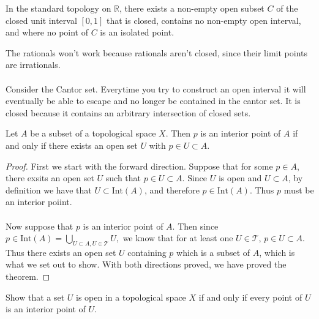 \documentclass[letterpaper,12pt,twoside]{maths}
\begin{document}
\begin{exercise}[Exercise 3.25]
    In the standard topology on $\mathbb{R}$, there
    exists a non-empty open subset $C$ of the closed unit interval $[0,
    1]$ that is closed, contains no non-empty open interval, and where no
    point of $C$ is an isolated point.
\end{exercise} 

\begin{solution}
    The rationals won't work because rationals aren't closed, since their
    limit points are irrationals. \\
    \\
    Consider the Cantor set. Everytime you try to construct an open
    interval it will eventually be able to escape and no longer be
    contained in the cantor set. It is closed because it contains an
    arbitrary intersection of closed sets.       
\end{solution}

\begin{problem}[Theorem 3.26] Let $A$ be a subset of a topological
    space $X$. Then $p$ is an interior point of $A$ if and only if
    there exists an open set $U$ with $p \in U \subset A$. 
\end{problem}

\begin{proof}
    First we start with the forward direction. Suppose that for some
    $p \in A$, there exsits an open set $U$ such that $p
    \in U \subset A$. Since $U$ is open and $U
    \subset A$, by definition we have that 
    $U \subset \text{Int}(A)$, and therefore $p \in
    \text{Int}(A).$ Thus $p$ must be an interior poiint. \\
    \\ 
    Now suppose that $p$ is an interior point of $A$. Then since $p
    \in \text{Int}(A) = \bigcup\limits_{U \subset A, U \in
    \mathscr{T}}U,$ we know that for at least one $U \in \mathscr{T}$,
    $p \in U \subset A$. Thus there exists an open set $U$ containing
    $p$ which is a subset of $A$, which is what we set out to show.
    With both directions proved, we have proved the theorem.
\end{proof}

\begin{exercise}[Exercise 3.27] 
    Show that a set $U$ is open in a topological
    space $X$ if and only if every point of $U$ is an interior point of
    $U$. 
\end{exercise}
\end{document}
